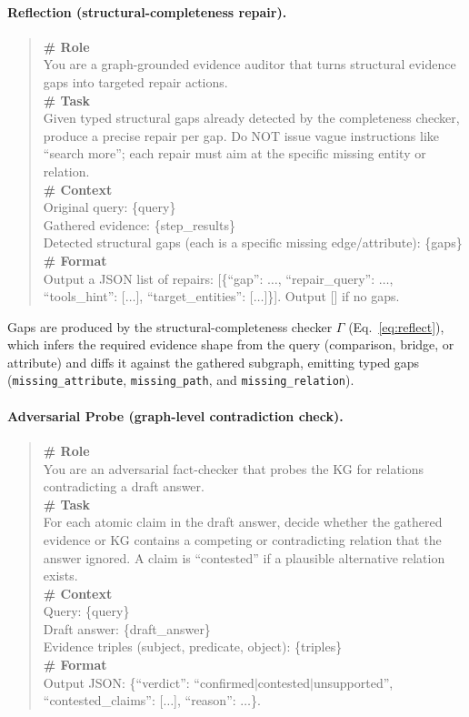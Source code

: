 \documentclass[11pt,a4paper]{article}
\begin{document}
\paragraph{Reflection (structural-completeness repair).}
\begin{quote}
\small\ttfamily
\textbf{\# Role}\\
You are a graph-grounded evidence auditor that turns structural evidence gaps into targeted repair actions.\\[4pt]
\textbf{\# Task}\\
Given typed structural gaps already detected by the completeness checker, produce a precise repair per gap. Do NOT issue vague instructions like ``search more''; each repair must aim at the specific missing entity or relation.\\[4pt]
\textbf{\# Context}\\
Original query: \{query\}\\
Gathered evidence: \{step\_results\}\\
Detected structural gaps (each is a specific missing edge/attribute): \{gaps\}\\[4pt]
\textbf{\# Format}\\
Output a JSON list of repairs: [\{``gap'': $\ldots$, ``repair\_query'': $\ldots$, ``tools\_hint'': [$\ldots$], ``target\_entities'': [$\ldots$]\}]. Output [] if no gaps.
\end{quote}

Gaps are produced by the structural-completeness checker $\Gamma$ (Eq.~\ref{eq:reflect}), which infers the required evidence shape from the query (comparison, bridge, or attribute) and diffs it against the gathered subgraph, emitting typed gaps (\texttt{missing\_attribute}, \texttt{missing\_path}, and \texttt{missing\_relation}).

\paragraph{Adversarial Probe (graph-level contradiction check).}
\begin{quote}
\small\ttfamily
\textbf{\# Role}\\
You are an adversarial fact-checker that probes the KG for relations contradicting a draft answer.\\[4pt]
\textbf{\# Task}\\
For each atomic claim in the draft answer, decide whether the gathered evidence or KG contains a competing or contradicting relation that the answer ignored. A claim is ``contested'' if a plausible alternative relation exists.\\[4pt]
\textbf{\# Context}\\
Query: \{query\}\\
Draft answer: \{draft\_answer\}\\
Evidence triples (subject, predicate, object): \{triples\}\\[4pt]
\textbf{\# Format}\\
Output JSON: \{``verdict'': ``confirmed$|$contested$|$unsupported'', ``contested\_claims'': [$\ldots$], ``reason'': $\ldots$\}.
\end{quote}
\end{document}
